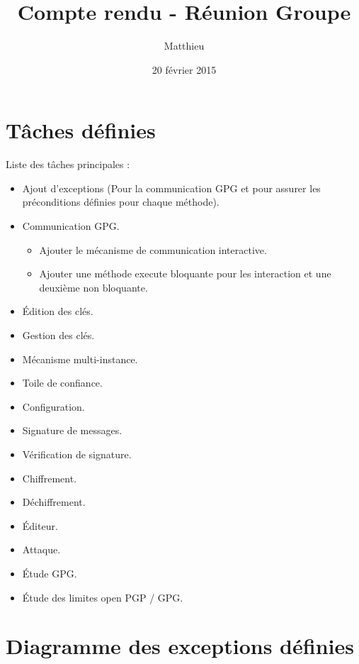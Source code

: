 \documentclass{../../res/CR-projet}
\title{Compte rendu - Réunion Groupe}
\author{Matthieu \bsc{FIN}}
\date{20 février 2015}
\begin{document}
\maketitle
\newpage

\newpage

\section{Tâches définies}

Liste des tâches principales :
\begin{itemize}
  \item Ajout d'exceptions (Pour la communication GPG et pour assurer les préconditions définies pour chaque méthode).
  \item Communication GPG.
  \begin{itemize}
    \item Ajouter le mécanisme de communication interactive.
    \item Ajouter une méthode execute bloquante pour les interaction et une deuxième non bloquante.
  \end{itemize}
  \item Édition des clés.
  \item Gestion des clés.
  \item Mécanisme multi-instance.
  \item Toile de confiance.
  \item Configuration.
  \\
  \item Signature de messages.
  \item Vérification de signature.
  \item Chiffrement.
  \item Déchiffrement.
  \item Éditeur.
  \item Attaque.
  \item Étude GPG.
  \item Étude des limites open PGP / GPG.
\end{itemize}


\section{Diagramme des exceptions définies}
\end{document}
